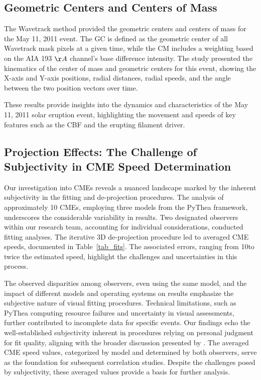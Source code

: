 \subsection{Geometric Centers and Centers of Mass}
The Wavetrack method provided the geometric centers and centers of mass for the May 11, 2011 event. The GC is defined as the geometric center of all Wavetrack mask pixels at a given time, while the CM includes a weighting based on the AIA 193 $\AA$ channel's base difference intensity. The study presented the kinematics of the center of mass and geometric centers for this event, showing the X-axis and Y-axis positions, radial distances, radial speeds, and the angle between the two position vectors over time.

These results provide insights into the dynamics and characteristics of the May 11, 2011 solar eruption event, highlighting the movement and speeds of key features such as the CBF and the erupting filament driver.

\subsection{Projection Effects: The Challenge of Subjectivity in CME Speed Determination}
Our investigation into CMEs reveals a nuanced landscape marked by the inherent subjectivity in the fitting and de-projection procedures. The analysis of approximately 10 CMEs, employing three models from the PyThea framework, underscores the considerable variability in results. Two designated observers within our research team, accounting for individual considerations, conducted fitting analyses. The iterative 3D de-projection procedure led to averaged CME speeds, documented in Table~\ref{tab_fits}. The associated errors, ranging from 10\kms to twice the estimated speed, highlight the challenges and uncertainties in this process.

The observed disparities among observers, even using the same model, and the impact of different models and operating systems on results emphasize the subjective nature of visual fitting procedures. Technical limitations, such as PyThea computing resource failures and uncertainty in visual assessments, further contributed to incomplete data for specific events. Our findings echo the well-established subjectivity inherent in procedures relying on personal judgment for fit quality, aligning with the broader discussion presented by \citet{verbeke_2022}.
The averaged CME speed values, categorized by model and determined by both observers, serve as the foundation for subsequent correlation studies. Despite the challenges posed by subjectivity, these averaged values provide a basis for further analysis.

